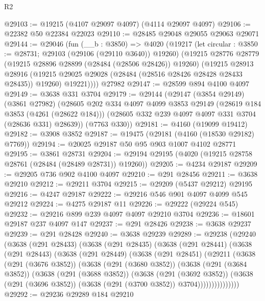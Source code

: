 \begin{lexlean}{R2}
\begin{coremodule}
@29103 := @19215 (@4107 @29097 @4097) (@4114 @29097 @4097)
@29106 := @22382 @50 @22384 @22023
@29110 := @28485 @29048 @29055 @29063 @29071
@29144 := @29046
    (fun (__b : @3850) =>
    @4020
      (@19217
        (let circular : @3850 := @28731; @29103 (@29106 (@29110 @3640)) @19260)
        (@19215
          @28776
          @28779
          (@19215 @28896 @28899 (@28484 (@28506 @28426)) @19260)
          (@19215
            @28913
            @28916
            (@19215 @29025 @29028 (@28484 (@28516 @28426 @28428 @28433 @28435)) @19260)
            @19221))))
    @27982
@29147 := @28599 @894 @4100 @4097
@29149 := @3638 @331 @3704
@29179 := @29144
    (@29147
      (@3854 @29149)
      (@3861 @27982)
      (@28605
        @202
        @334
        @4097
        @4099
        @3853
        @29149
        (@28619 @184 @3853 (@4261 (@28622 @184)))
        (@28605 @332 @239 @4097 @4097 @331 @3704 (@28636 @331) @28639))
      (@7763 @330))
@29181 := @4160 (@19099 @19412)
@29182 := @3908 @3852
@29187 := @19475 (@29181 (@4160 (@18530 @29182) @7769))
@29194 := @20025 @29187 @50 @95 @903 @1007 @4102 @28771
@29195 := @3861 @28731
@29204 := @29194 @29195 (@4020 (@19215 @28758 @28761 (@28484 (@28489 @28731)) @19260))
@29205 := @4234 @29187
@29209 := @29205 @736 @902 @4100 @4097
@29210 := @291 @28456
@29211 := @3638 @29210
@29212 := @29211 @3704
@29215 := @29209 (@5437 @29212) @29195
@29216 := @4247 @29187
@29222 := @29216 @546 @901 @4097 @4099 @545 @29212
@29224 := @4275 @29187 @11
@29226 := @29222 (@29224 @545)
@29232 := @29216 @899 @239 @4097 @4097 @29210 @3704
@29236 := @18601 @29187 @237 @4097 @147
@29237 := @291 @28426
@29238 := @3638 @29237
@29239 := @291 @28428
@29240 := @3638 @29239
@29289 := @29238
    (@29240
      (@3638
        (@291 @28433)
        (@3638
          (@291 @28435)
          (@3638
            (@291 @28441)
            (@3638
              (@291 @28443)
              (@3638
                (@291 @28449)
                (@3638
                  (@291 @28451)
                  (@29211
                    (@3638
                      (@291 (@3676 @3852))
                      (@3638
                        (@291 (@3680 @3852))
                        (@3638
                          (@291 (@3684 @3852))
                          (@3638
                            (@291 (@3688 @3852))
                            (@3638
                              (@291 (@3692 @3852))
                              (@3638
                                (@291 (@3696 @3852))
                                (@3638 (@291 (@3700 @3852)) @3704)))))))))))))))
@29292 := @29236 @29289 @184 @29210

\end{coremodule}
\end{lexlean}
